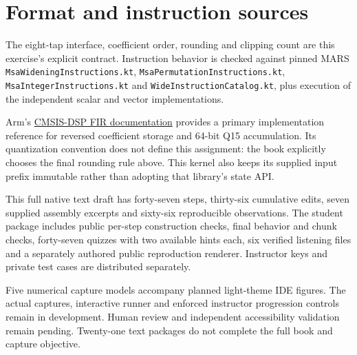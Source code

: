 \section*{Format and instruction sources}
The eight-tap interface, coefficient order, rounding and clipping count are this
exercise's explicit contract. Instruction behavior is checked against pinned MARS
\texttt{MsaWideningInstructions.kt}, \texttt{MsaPermutationInstructions.kt},
\texttt{MsaIntegerInstructions.kt} and \texttt{WideInstructionCatalog.kt}, plus
execution of the independent scalar and vector implementations.

Arm's \href{https://arm-software.github.io/CMSIS-DSP/v1.10.1/group__FIR.html}{CMSIS-DSP FIR documentation}
provides a primary implementation reference for reversed coefficient storage and
64-bit Q15 accumulation. Its quantization convention does not define this assignment:
the book explicitly chooses the final rounding rule above. This kernel also keeps
its supplied input prefix immutable rather than adopting that library's state API.

This full native text draft has forty-seven steps, thirty-six cumulative edits,
seven supplied assembly excerpts and sixty-six reproducible observations. The student
package includes public per-step construction checks, final behavior and chunk checks,
forty-seven quizzes with two available hints each, six verified listening files and a
separately authored public reproduction renderer. Instructor keys and private test
cases are distributed separately.

Five numerical capture models accompany planned light-theme IDE figures. The actual
captures, interactive runner and enforced instructor progression controls remain in
development. Human review and independent accessibility validation remain pending.
Twenty-one text packages do not complete the full book and capture objective.
